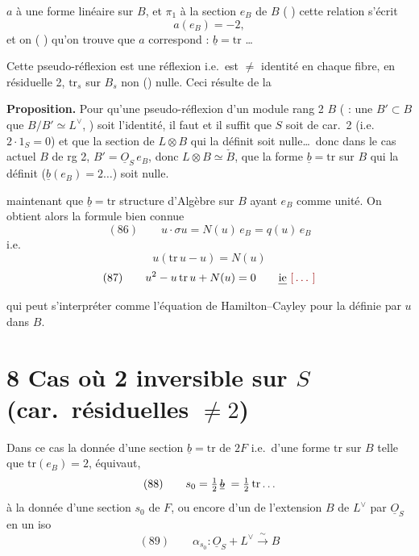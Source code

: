 \documentclass[11pt,a4paper]{article}
\begin{document}
$a$ à une forme linéaire sur $B$, et $\pi_1$ à la section $e_B$ de $B$
( \ill{}) cette relation s'écrit
\[
a(e_B) = -2 ,
\]
et  on 
(\struck{\ill{}} \ill{}) qu'on trouve  \ill{} que $a$
correspond : $\underline{b} = \mathrm{tr}$ \ldots\ \ill{}

 Cette pseudo-réflexion est une
réflexion i.e.\ est $\neq$ identité en chaque fibre,  \ill{} en
 résiduelle 2, \ill{} $\mathrm{tr}_s$ sur $B_s$ non
() nulle. Ceci résulte de la

\textbf{Proposition.} Pour qu'une pseudo-réflexion d'un module
  \struck{\ill{}} rang 2 $B$
( : une \ill{} $B' \subset B$  que
$B/B' \simeq L^{\vee}$, \ill{} ) soit l'identité, il faut et il
suffit que $S$ soit de car.\ 2 (i.e.\ $2 \cdot 1_S = 0$) et que la section de
$L \otimes B$ qui la définit soit nulle\ldots\ donc dans le cas actuel $B$ de rg 2,
$B' = \underline{O}_S\, e_B$, donc $L \otimes B \simeq \check{B}$, que la forme
$\underline{b} = \mathrm{tr}$ sur $B$ qui la définit ($\underline{b}(e_B) = 2 \ldots$)
soit nulle.

  maintenant \ill{} que $\underline{b} = \mathrm{tr}$
  
 structure d'Algèbre sur $B$ ayant $e_B$ comme unité. On obtient
alors la formule bien connue
\[
(86)\qquad u \cdot \sigma u = N(u)\, e_B = q(u)\, e_B
\]
i.e.
\[
u(\mathrm{tr}\, u - u) = N(u)
\]
\[
(87)\qquad u^2 - u\, \mathrm{tr}\, u + N(u) = 0 \qquad \text{\uncertain{ie} \ill{}}
\]

qui peut s'interpréter comme l'équation de Hamilton--Cayley pour
 la  \struck{\ill{}} définie par $u$ dans $B$.

\section{8 \quad Cas où 2 inversible sur $S$ (car.\ résiduelles $\neq 2$)}

Dans ce cas la donnée d'une section $\underline{b} = \mathrm{tr}$ de $2F$ i.e.\
d'une forme $\mathrm{tr}$ sur $B$ telle que $\mathrm{tr}(e_B) = 2$, équivaut,
\ill{}
\[
(88)\qquad s_0 = \tfrac{1}{2}\, \text{\struck{$\underline{b}$}}\; = \tfrac{1}{2}\, \mathrm{tr}\ldots
\]
à la donnée d'une section  $s_0$ de $F$, ou encore d'un 
de l'extension $B$ de $L^{\vee}$ par $\underline{O}_S$ en un iso
\[
(89)\qquad \alpha_{s_0} : \underline{O}_S + L^{\vee} \xrightarrow{\;\sim\;} B
\]
\end{document}

